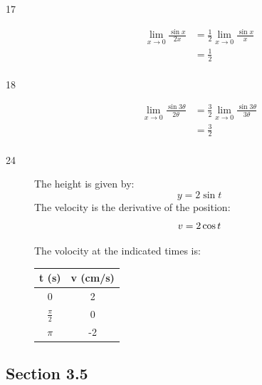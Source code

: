 \documentclass{exam}
\begin{document}
\begin{description}
\item[17]
\begin{align*}
  \lim_{x \to 0} \frac{\sin x}{2x} &= \frac{1}{2} \lim_{x \to 0} \frac{\sin x}{x} \\
    &= \frac{1}{2}  \\
\end{align*}

\item[18]
\begin{align*}
  \lim_{x \to 0} \frac{\sin 3 \theta}{2 \theta} &= \frac{3}{2} \lim_{x \to 0} \frac{\sin 3 \theta}{3 \theta} \\
    &= \frac{3}{2}  \\
\end{align*}

\item[24]

The height is given by:
\[
  y = 2 \sin t
\]
The velocity is the derivative of the position:
\[
  v = 2 \cos t \\
\]

The volocity at the indicated times is:

\begin{tabular}{cc}
\toprule
t (s) & v (cm/s)\\
\midrule
0               &  2 \\
$\frac{\pi}{2}$ &  0 \\
$\pi$           & -2 \\
\bottomrule
\end{tabular}

\end{description}

\subsection{Section 3.5}
\end{document}
